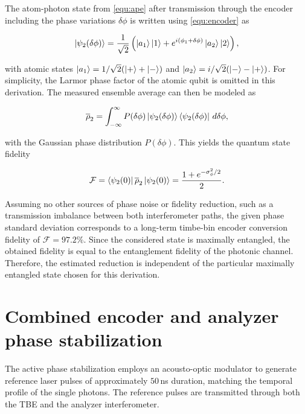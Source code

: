 \documentclass[reprint, superscriptaddress, longbibliography, floatfix, twocolumn, nofootinbib, amsmath, amssymb, aps, showkeys]{revtex4-2}
\begin{document}
The atom-photon state from \autoref{equ:ape} after transmission through the encoder including the phase variations $\delta\phi$ is written using \autoref{equ:encoder} as

\begin{align}\label{equ:ape_encoder}
\ket{\psi_2(\delta\phi)}=\frac{1}{\sqrt{2}}\left(\ket{a_1}\ket{1}+e^{i(\phi_1+\delta\phi)}\ket{a_2}\ket{2}\right),
\end{align}

with atomic states $\ket{a_1}=1/\sqrt{2}(\ket{+}+\ket{-})$ and $\ket{a_2}=i/\sqrt{2}(\ket{-}-\ket{+})$. For simplicity, the Larmor phase factor of the atomic qubit is omitted in this derivation. The measured ensemble average can then be modeled as

\begin{align}
    \overline{\rho}_2=\int_{-\infty}^\infty P(\delta\phi)\ket{\psi_2(\delta\phi)}\bra{\psi_2(\delta\phi)}\,d\delta\phi,
\end{align}

with the Gaussian phase distribution $P(\delta\phi)$. This yields the quantum state fidelity

\begin{align}
  \mathcal{F}= \bra{\psi_2(0)}\overline{\rho}_2\ket{\psi_2(0)}=\frac{1+e^{-\sigma_\phi^2/2}}{2}.
\end{align}

Assuming no other sources of phase noise or fidelity reduction, such as a transmission imbalance between both interferometer paths, the given phase standard deviation corresponds to a long-term timbe-bin encoder conversion fidelity of $\mathcal{F}=97.2\%$. Since the considered state is maximally entangled, the obtained fidelity is equal to the entanglement fidelity of the photonic channel. Therefore, the estimated reduction is independent of the particular maximally entangled state chosen for this derivation.

\section{Combined encoder and analyzer phase stabilization}\label{app:phase_stab}
The active phase stabilization employs an acousto-optic modulator to generate reference laser pulses of approximately $50\,$ns duration, matching the temporal profile of the single photons. The reference pulses are transmitted through both the TBE and the analyzer interferometer.
\end{document}
